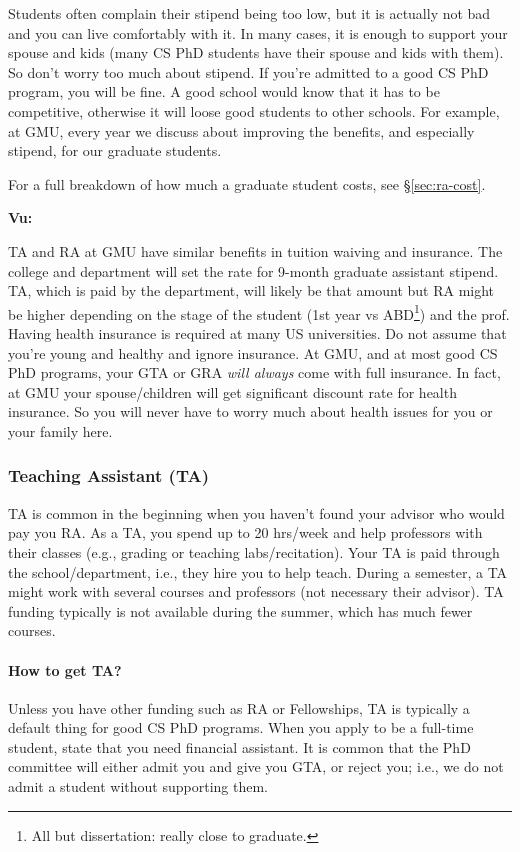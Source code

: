 \documentclass[11pt]{article}
\newenvironment{commentbox}[1][]{
\small
    \begin{cbox}
    \textbf{#1} 
 }{
   \end{cbox}
}
\begin{document}
Students often complain their stipend being too low, but it is actually not bad and you can live comfortably with it.  In many cases, it is enough to support your spouse and kids (many CS PhD students have their spouse and kids with them). So don't worry too much about stipend.  If you're admitted to a good CS PhD program, you will be fine. A good school would know that it has to be competitive, otherwise it will loose good students to other schools.  For example, at GMU, every year we discuss about improving the benefits, and especially stipend, for our graduate students. 

For a full breakdown of how much a graduate student costs, see \S\ref{sec:ra-cost}.

\begin{commentbox}[Vu:]
TA and RA at GMU have similar benefits in tuition waiving and insurance.  The college and department will set the rate for 9-month graduate assistant stipend.  TA, which is paid by the department, will likely be that amount but RA might be higher depending on the stage of the student (1st year vs ABD\footnote{All but dissertation: really close to graduate.}) and the prof. 
\tcblower
Having health insurance is required at many US universities.  Do not assume that you're young and healthy and ignore insurance.  At GMU, and at most good CS PhD programs, your GTA or GRA \emph{will always} come with full insurance. In fact, at GMU your spouse/children will get significant discount rate for health insurance.  So you will never have to worry much about health issues for you or your family here.
\end{commentbox}


\subsubsection{Teaching Assistant (TA)}

TA is common in the beginning when you haven't found your advisor who would pay you RA. As a TA, you spend up to 20 hrs/week and help professors with their classes (e.g., grading or teaching labs/recitation). Your TA is paid through the school/department, i.e., they hire you to help teach.  During a semester, a TA might work with several courses and professors (not necessary their advisor).  TA funding typically is not available during the summer, which has much fewer courses.

\paragraph{How to get TA?}  Unless you have other funding such as RA or Fellowships, TA is typically a default thing for good CS PhD programs. When you apply to be a full-time student,  state that you need financial assistant. It is common that the PhD committee will either admit you and give you GTA, or reject you; i.e., we do not admit a student without supporting them.  
\end{document}
